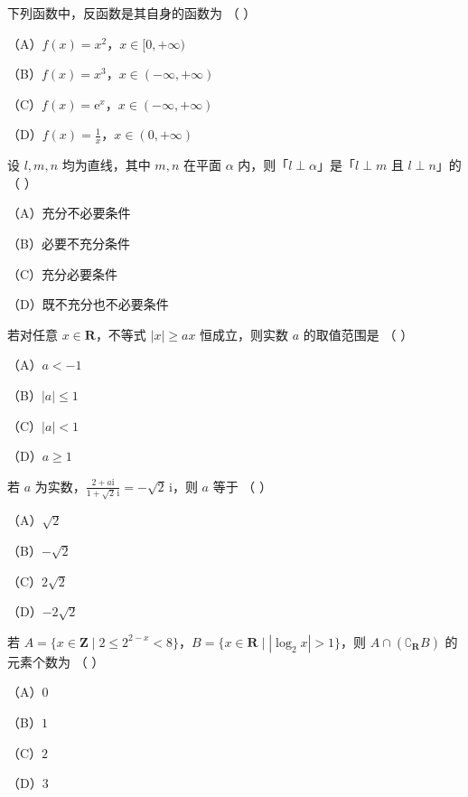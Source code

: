 


\begin{question}
下列函数中，反函数是其自身的函数为 （ ）

（A）$f(x)=x^2$，$x\in[0,+\infty)$

（B）$f(x)=x^3$，$x\in(-\infty,+\infty)$

（C）$f(x)=\mathrm{e}^x$，$x\in(-\infty,+\infty)$

（D）$f(x)=\frac1x$，$x\in(0,+\infty)$

\end{question}
\begin{question}
设 $l,m,n$ 均为直线，其中 $m,n$ 在平面 $\alpha$ 内，则「$l\perp\alpha$」是「$l\perp m$ 且 $l\perp n$」的 （ ）

（A）充分不必要条件

（B）必要不充分条件

（C）充分必要条件

（D）既不充分也不必要条件

\end{question}
\begin{question}
若对任意 $x\in\mathbf R$，不等式 $|x|\geqslant ax$ 恒成立，则实数 $a$ 的取值范围是 （ ）

（A）$a<-1$

（B）$|a|\leqslant1$

（C）$|a|<1$

（D）$a\geqslant1$

\end{question}
\begin{question}
若 $a$ 为实数，$\frac{2+a\mathrm i}{1+\sqrt2\,\mathrm i}=-\sqrt2\,\mathrm i$，则 $a$ 等于 （ ）

（A）$\sqrt2$

（B）$-\sqrt2$

（C）$2\sqrt2$

（D）$-2\sqrt2$

\end{question}
\begin{question}
若 $A=\{x\in\mathbf Z\mid 2\leqslant2^{2-x}<8\}$，$B=\{x\in\mathbf R\mid |\log_2x|>1\}$，则 $A\cap(\complement_{\mathbf R}B)$ 的元素个数为 （ ）

（A）$0$

（B）$1$

（C）$2$

（D）$3$

\end{question}
